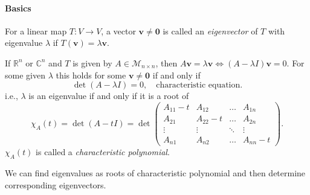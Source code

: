 \documentclass[a4paper]{article}
\begin{document}
    \paragraph{Basics}
    \begin{definition}
      For a linear map $T:V\to V$, a vector $\mathbf{v}\neq
      \mathbf{0}$ is called an \textit{eigenvector} of $T$ with
      eigenvalue $\lambda$ if $ T(\mathbf{v})=\lambda\mathbf{v} $.
    \end{definition}
    If $ \mathbb{R}^{n} $ or $ \mathbb{C}^{n} $ and $T$ is given by $
    A\in \mathcal{M}_{n\times n} $, then $
    A\mathbf{v}=\lambda\mathbf{v} \Leftrightarrow (A-\lambda
    I)\mathbf{v}=0 $. For some given $ \lambda $ this holds for some
    $ \mathbf{v}\neq \mathbf{0} $ if and only if
    \[
      \det (A-\lambda I)=0,\quad \text{characteristic equation}
    .\]
    i.e., $ \lambda $ is an eigenvalue if and only if it is a root of
    \[
      \chi_A(t) = \det (A-tI) = \det
      \begin{pmatrix}
        A_{11}-t & A_{12} & \ldots & A_{1 n} \\
        A_{21} & A_{22}-t & \ldots & A_{2 n} \\
        \vdots &\vdots & \ddots  & \vdots \\
        A_{n 1} & A_{n 2} & \ldots & A_{n n}-t
      \end{pmatrix}
    .\]
    $ \chi_A(t) $ is called a \textit{characteristic polynomial}.

    We can find eigenvalues as roots of characteristic polynomial and
    then determine corresponding eigenvectors.
\end{document}

